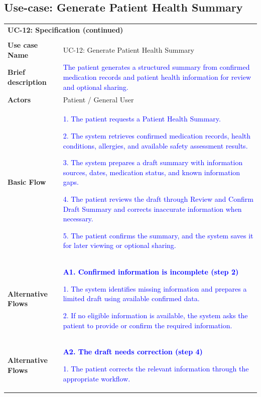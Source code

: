 \subsection{Use-case: Generate Patient Health Summary}
\label{uc:uc-12}
\begin{longtable}{|p{}|p{}|}
\hline
\endfirsthead
\multicolumn{2}{l}{\textbf{UC-12: Specification (continued)}}\\\\
\hline
\endhead
\textbf{Use case Name} & UC-12: Generate Patient Health Summary \\ \hline
\textbf{Brief description} &
\textcolor{blue}{The patient generates a structured summary from confirmed medication records and patient health information for review and optional sharing.}
\\ \hline
\textbf{Actors} & Patient / General User \\ \hline
\textbf{Basic Flow} &
\textcolor{blue}{1. The patient requests a Patient Health Summary.}\par
\textcolor{blue}{2. The system retrieves confirmed medication records, health conditions, allergies, and available safety assessment results.}\par
\textcolor{blue}{3. The system prepares a draft summary with information sources, dates, medication status, and known information gaps.}\par
\textcolor{blue}{4. The patient reviews the draft through Review and Confirm Draft Summary and corrects inaccurate information when necessary.}\par
\textcolor{blue}{5. The patient confirms the summary, and the system saves it for later viewing or optional sharing.}
\\ \hline
\textbf{Alternative Flows} &
\textcolor{blue}{\textbf{A1. Confirmed information is incomplete (step 2)}}\par
\textcolor{blue}{1. The system identifies missing information and prepares a limited draft using available confirmed data.}\par
\textcolor{blue}{2. If no eligible information is available, the system asks the patient to provide or confirm the required information.}
\\ \hline
\textbf{Alternative Flows} &
\textcolor{blue}{\textbf{A2. The draft needs correction (step 4)}}\par
\textcolor{blue}{1. The patient corrects the relevant information through the appropriate workflow.}\par

\end{longtable}
